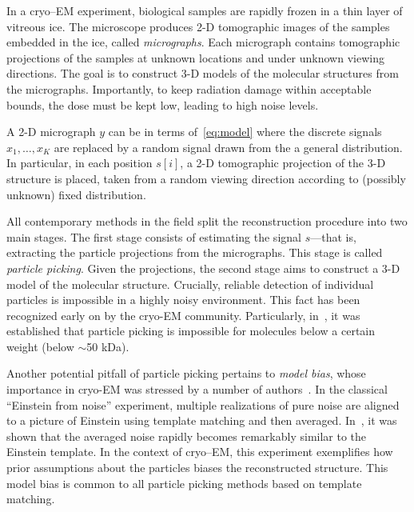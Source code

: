 \documentclass[12pt]{article}
\newcommand{\1}{\mathbf{1}}
\theoremstyle{plain}
\theoremstyle{definition}
\theoremstyle{remark}
\theoremstyle{plain}
\theoremstyle{remark}
\theoremstyle{plain}
\theoremstyle{plain}
\theoremstyle{plain}
\numberwithin{equation}{section}
\begin{document}
In a cryo--EM experiment, biological samples are rapidly frozen in a thin layer of vitreous ice.
The microscope produces 2-D tomographic images of the samples embedded in the ice, called \emph{micrographs}. Each micrograph contains tomographic projections of the samples at unknown locations and under unknown viewing directions. The goal is to construct 3-D models of the molecular structures from the micrographs. 
Importantly, to keep radiation damage within acceptable bounds, the dose must be kept low, leading to high noise levels.

A 2-D micrograph $y$ can be in terms of~\eqref{eq:model} where the discrete signals $x_1,\ldots,x_K$ are replaced by a random signal drawn from the a general distribution. In particular, in each position $s[i]$, a 2-D tomographic projection of the 3-D structure is placed, taken from a random viewing direction according to (possibly unknown) fixed distribution. 

All contemporary methods in the field split the reconstruction procedure into two main  stages.
The first stage consists of estimating the signal $s$---that is, extracting the particle projections from the micrographs. This stage is called \emph{particle picking}. Given the projections, the second stage aims to construct a 3-D model of the molecular structure. 
Crucially, reliable detection of individual particles is impossible in a highly noisy environment. This fact has been recognized early on by the cryo-EM community. 
Particularly, in~\cite{henderson1995limitations,glaeser1999electron}, it was established that particle picking is impossible for molecules below a certain weight (below $\sim$50 kDa). 

Another potential pitfall of particle picking pertains to \emph{model bias}, whose importance in cryo-EM was stressed by a number of authors~\cite{shatsky2009method,vanheel1992correlation,henderson2013avoiding,vanheel2013finding}. In the classical ``Einstein from noise'' experiment, multiple realizations of pure noise are aligned to a picture of Einstein using template matching and then averaged. In~\cite{shatsky2009method}, it was shown that the averaged noise rapidly becomes remarkably similar to the Einstein template. In the context of cryo--EM, this experiment exemplifies how prior assumptions about the particles biases the reconstructed structure. This model bias is common to all particle picking methods based on template matching. %
\end{document}
